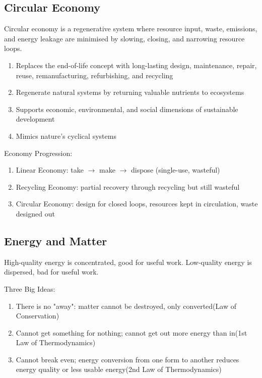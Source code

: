 \documentclass[12pt, a4paper]{article}
\begin{document}
\begin{multicols*}{3}
\section{Circular Economy}
Circular economy is a regenerative system where resource input, waste, emissions, and energy leakage are minimised by slowing, closing, and narrowing resource loops.  
\begin{enumerate}[\roman*.]
  \item Replaces the end-of-life concept with long-lasting design, maintenance, repair, reuse, remanufacturing, refurbishing, and recycling
  \item Regenerate natural systems by returning valuable nutrients to ecosystems
  \item Supports economic, environmental, and social dimensions of sustainable development
  \item Mimics nature's cyclical systems 
\end{enumerate}

Economy Progression:
\begin{enumerate}[\roman*.]
  \item Linear Economy: take $\rightarrow$ make $\rightarrow$ dispose (single-use, wasteful)
  \item Recycling Economy: partial recovery through recycling but still wasteful
  \item Circular Economy: design for closed loops, resources kept in circulation, waste designed out
\end{enumerate}

\subsection{Energy and Matter}

High-quality energy is concentrated, good for useful work.
Low-quality energy is dispersed, bad for useful work.

Three Big Ideas:
\begin{enumerate}[\roman*.]
  \item There is no "away": matter cannot be destroyed, only converted\hfill(Law of Conservation)
  \item Cannot get something for nothing; cannot get out more energy than in\hfill(1st Law of Thermodynamics)
  \item Cannot break even; energy conversion from one form to another reduces energy quality or less usable energy\hfill(2nd Law of Thermodynamics)
\end{enumerate}


\end{multicols*}
\end{document}
